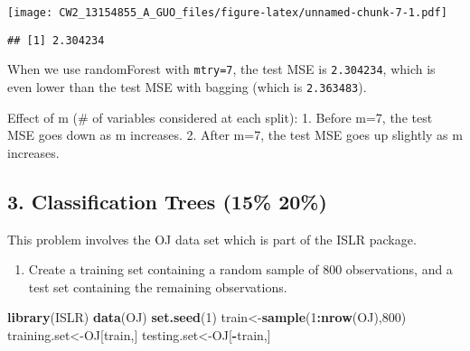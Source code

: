 \documentclass[]{article}
\newenvironment{Shaded}{\begin{snugshade}}{\end{snugshade}}
\newcommand{\KeywordTok}[1]{\textcolor[rgb]{0.13,0.29,0.53}{\textbf{#1}}}
\newcommand{\DataTypeTok}[1]{\textcolor[rgb]{0.13,0.29,0.53}{#1}}
\newcommand{\DecValTok}[1]{\textcolor[rgb]{0.00,0.00,0.81}{#1}}
\newcommand{\OtherTok}[1]{\textcolor[rgb]{0.56,0.35,0.01}{#1}}
\newcommand{\OperatorTok}[1]{\textcolor[rgb]{0.81,0.36,0.00}{\textbf{#1}}}
\newcommand{\NormalTok}[1]{#1}
\providecommand{\tightlist}{%
  \setlength{\itemsep}{0pt}\setlength{\parskip}{0pt}}
\begin{document}
\texttt{[image: CW2\_13154855\_A\_GUO\_files/figure-latex/unnamed-chunk-7-1.pdf]}

\begin{Shaded}
\end{Shaded}

\begin{verbatim}
## [1] 2.304234
\end{verbatim}

When we use randomForest with \texttt{mtry=7}, the test MSE is
\texttt{2.304234}, which is even lower than the test MSE with bagging
(which is \texttt{2.363483}).

Effect of m (\# of variables considered at each split): 1. Before m=7,
the test MSE goes down as m increases. 2. After m=7, the test MSE goes
up slightly as m increases.

\subsection{3. Classification Trees (15\% \textbar{}
20\%)}\label{classification-trees-15-20}

This problem involves the OJ data set which is part of the ISLR package.

\begin{enumerate}
\def\labelenumi{(\alph{enumi})}
\tightlist
\item
  Create a training set containing a random sample of 800 observations,
  and a test set containing the remaining observations.
\end{enumerate}

\begin{Shaded}
\begin{Highlighting}[]
\KeywordTok{library}\NormalTok{(ISLR)}
\KeywordTok{data}\NormalTok{(OJ)}
\KeywordTok{set.seed}\NormalTok{(}\DecValTok{1}\NormalTok{)}
\NormalTok{train<-}\KeywordTok{sample}\NormalTok{(}\DecValTok{1}\OperatorTok{:}\KeywordTok{nrow}\NormalTok{(OJ),}\DecValTok{800}\NormalTok{)}
\NormalTok{training.set<-OJ[train,]}
\NormalTok{testing.set<-OJ[}\OperatorTok{-}\NormalTok{train,]}
\end{Highlighting}
\end{Shaded}
\end{document}
